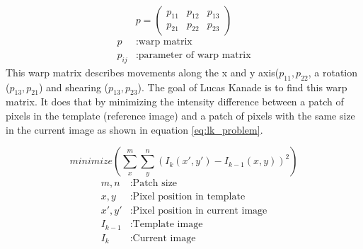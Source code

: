 \documentclass[11pt,a4paper,titlepage,oneside]{report}
\begin{document}
\begin{equation}\label{eq:lk_warp}
  p=\begin{pmatrix}
    p_{11} & p_{12} & p_{13} \\
    p_{21} & p_{22} & p_{23}
  \end{pmatrix}
\end{equation}
\begin{align*}
  p        &:  \text{warp matrix}\\
  p_{ij}  &:  \text{parameter of warp matrix}
\end{align*}
This warp matrix describes movements along the x and y axis($p_{11},p_{22}$, a rotation ($p_{13},p_{21}$) and shearing ($p_{13},p_{23}$). The goal of Lucas Kanade is to find this warp matrix. It does that by minimizing the intensity difference between a patch of pixels in the template (reference image) and a patch of pixels with the same size in the current image as shown in equation \ref{eq:lk_problem}. 

\begin{equation}\label{eq:lk_problem}
	minimize(\sum_x^m\sum_y^n(I_{k}(x',y')-I_{k-1}(x,y))^2)
\end{equation}
\begin{align*}
	m,n				 &: \text{Patch size}\\
  x,y        &: \text{Pixel position in template}\\
  x',y'      &: \text{Pixel position in current image}\\
  I_{k-1}    &: \text{Template image}\\
  I_{k}      &: \text{Current image}
\end{align*}
\end{document}
